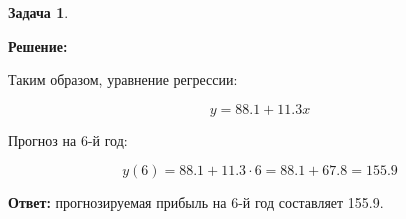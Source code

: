 \documentclass[a4paper,11pt]{article}
\newenvironment{shdd}{\begin{mdframed}[backgroundcolor=shadecolor]}{\end{mdframed}}
\theoremstyle{definition}
\newtheorem{problem}{Задача}\setlength{\parindent}{0pt}
\newenvironment{solution}
{\begin{shdd}
     \textbf{Решение:}\par\setlength{\parindent}{0pt}}
     {
\end{shdd}}
\newenvironment{answer}
{\par\noindent\textbf{Ответ:}}
{\par}
\begin{document}
\begin{problem}
\begin{solution}
            Таким образом, уравнение регрессии:

            \[
            y = 88.1 + 11.3x
            \]

            Прогноз на 6-й год:

            \[
            y(6) = 88.1 + 11.3 \cdot 6 = 88.1 + 67.8 = 155.9
            \]

        \end{solution}

        \begin{answer}
            прогнозируемая прибыль на 6-й год составляет 155.9.
        \end{answer}

    \end{problem}
\end{document}
